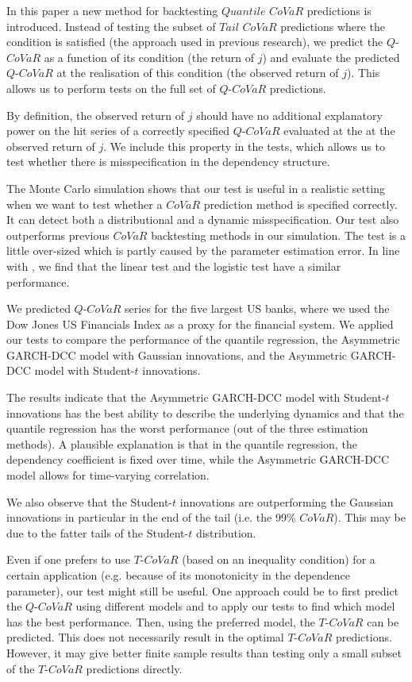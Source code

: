 \documentclass[12pt]{article}
\begin{document}
In this paper a new method for backtesting $Quantile$ $CoVaR$ predictions is introduced. Instead of testing the subset of $Tail$ $CoVaR$ predictions where the condition is satisfied (the approach used in previous research), we predict the $Q$-$CoVaR$ as a function of its condition (the return of $j$) and evaluate the predicted $Q$-$CoVaR$ at the realisation of this condition (the observed return of $j$). This allows us to perform tests on the full set of $Q$-$CoVaR$ predictions.

By definition, the observed return of $j$ should have no additional explanatory power on the hit series of a correctly specified $Q$-$CoVaR$ evaluated at the at the observed return of $j$. We include this property in the tests, which allows us to test whether there is misspecification in the dependency structure.

The Monte Carlo simulation shows that our test is useful in a realistic setting when we want to test whether a $CoVaR$ prediction method is specified correctly. It can detect both a distributional and a dynamic misspecification. Our test also outperforms previous $CoVaR$ backtesting methods in our simulation. The test is a little over-sized which is partly caused by the parameter estimation error. In line with \citet{nonlineartest}, we find that the linear test and the logistic test have a similar performance.

We predicted $Q$-$CoVaR$ series for the five largest US banks, where we used the Dow Jones US Financials Index as a proxy for the financial system.  We applied our tests to compare the performance of the quantile regression, the Asymmetric GARCH-DCC model with Gaussian innovations, and the Asymmetric GARCH-DCC model with Student-$t$ innovations.

The results indicate that the Asymmetric GARCH-DCC model with Student-$t$ innovations has the best ability to describe the underlying dynamics and that the quantile regression has the worst performance (out of the three estimation methods). A plausible explanation is that in the quantile regression, the dependency coefficient is fixed over time, while the Asymmetric GARCH-DCC model allows for time-varying correlation.

We also observe that the Student-$t$ innovations are outperforming the Gaussian innovations in particular in the end of the tail (i.e. the 99\% $CoVaR$). This may be due to the fatter tails of the Student-$t$ distribution.

Even if one prefers to use $T$-$CoVaR$ (based on an inequality condition) for a certain application (e.g. because of its monotonicity in the dependence parameter), our test might still be useful. One approach could be to first predict the $Q$-$CoVaR$ using different models and to apply our tests to find which model has the best performance. Then, using the preferred model, the $T$-$CoVaR$ can be predicted. This does not necessarily result in the optimal $T$-$CoVaR$ predictions. However, it may give better finite sample results than testing only a small subset of the $T$-$CoVaR$ predictions directly.
\end{document}

